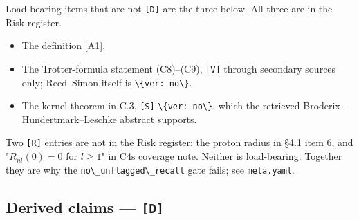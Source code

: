 \documentclass[11pt,a4paper]{article}
\providecommand{\passthrough}[1]{#1}
\providecommand{\tightlist}{\setlength{\itemsep}{0pt}\setlength{\parskip}{0pt}}
\begin{document}
{Load-bearing items that are not \passthrough{\lstinline![D]!} are the three below. All three are in the Risk register.

\begin{itemize}
\tightlist
\item
  The definition {[}A1{]}.
\item
  The Trotter-formula statement (C8)--(C9), \passthrough{\lstinline![V]!} through secondary sources only; Reed--Simon itself is \passthrough{\lstinline!\{ver: no\}!}.
\item
  The kernel theorem in C.3, \passthrough{\lstinline![S]!} \passthrough{\lstinline!\{ver: no\}!}, which the retrieved Broderix--Hundertmark--Leschke abstract supports.
\end{itemize}

Two \passthrough{\lstinline![R]!} entries are not in the Risk register: the proton radius in §4.1 item 6, and "\(R_{nl}(0)=0\) for \(l\ge1\)" in C4\textquotesingle s coverage note. Neither is load-bearing. Together they are why the \passthrough{\lstinline!no\_unflagged\_recall!} gate fails; see \passthrough{\lstinline!meta.yaml!}.

\hypertarget{derived-claims-d}{%
\subsection{\texorpdfstring{Derived claims --- \texttt{{[}D{]}}}{Derived claims --- {[}D{]}}}\label{derived-claims-d}}

}
\end{document}
